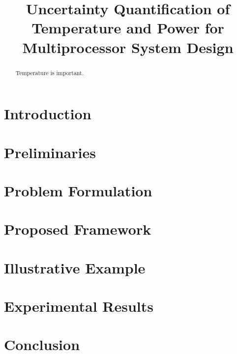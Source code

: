 \documentclass[conference]{IEEEtran}
\begin{document}
  \title{Uncertainty Quantification of Temperature and Power for Multiprocessor System Design}

  \author{
    \and
    \and
  }

  \maketitle

  \begin{abstract}
    Temperature is important.
  \end{abstract}

  \section{Introduction} 
  

  \section{Preliminaries}
  

  \section{Problem Formulation} 
  

  \section{Proposed Framework}
  

  \section{Illustrative Example} 
  

  \section{Experimental Results} 
  

  \section{Conclusion}
  

  \printbibliography
\end{document}
